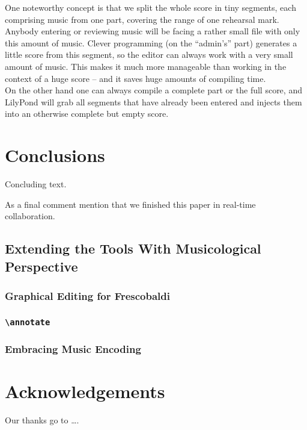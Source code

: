 \documentclass[11pt,a4paper]{article}
\begin{document}
One noteworthy concept is that we split the whole score in tiny segments, each comprising
music from one part, covering the range of one rehearsal mark. Anybody entering or
reviewing music will be facing a rather small file with only this amount of music.
Clever programming (on the “admin's” part) generates a little score from this segment, so
the editor can always work with a very small amount of music. This makes it much more
manageable than working in the context of a huge score -- and it saves huge amounts of
compiling time.\\
On the other hand one can always compile a complete part or the full score, and LilyPond
will grab all segments that have already been entered and injects them into an otherwise
complete but empty score.

\section{Conclusions}\label{sec:conclusions}

Concluding text.

As a final comment mention that we finished this paper in real-time collaboration.


\subsection{Extending the Tools With Musicological Perspective}

\subsubsection{Graphical Editing for Frescobaldi}

\subsubsection{\texttt{\textbackslash annotate}}

\subsubsection{Embracing Music Encoding}



\section{Acknowledgements}

Our thanks go to \ldots .
\end{document}
